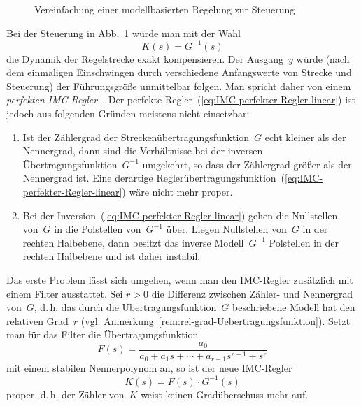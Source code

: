 \begin{figure}
\begin{centering}
\resizebox{0.65\textwidth}{!}{}
\par\end{centering}
\caption{Vereinfachung einer modellbasierten Regelung zur Steuerung\label{fig:Struktur-IMC-Steuerung}}
\end{figure}

Bei der Steuerung in Abb.~\ref{fig:Struktur-IMC-Steuerung} würde
man mit der Wahl 
\begin{equation}
K(s)=G^{-1}(s)\label{eq:IMC-perfekter-Regler-linear}
\end{equation}
die Dynamik der Regelstrecke exakt kompensieren. Der Ausgang~$y$
würde (nach dem einmaligen Einschwingen durch verschiedene Anfangswerte
von Strecke und Steuerung) der Führungsgröße unmittelbar folgen. Man
spricht daher von einem \emph{perfekten} \emph{IMC-Regler}~\cite{garcia1982}.
Der perfekte Regler~(\ref{eq:IMC-perfekter-Regler-linear}) ist jedoch
aus folgenden Gründen meistens nicht einsetzbar:
\begin{enumerate}
\item \label{enu:IMC-Problem1}Ist der Zählergrad der Streckenübertragungsfunktion~$G$
echt kleiner als der Nennergrad, dann sind die Verhältnisse bei der
inversen Übertragungsfunktion~$G^{-1}$ umgekehrt, so dass der Zählergrad
größer als der Nennergrad ist. Eine derartige Reglerübertragungsfunktion~(\ref{eq:IMC-perfekter-Regler-linear})
wäre nicht mehr proper. 
\item \label{enu:IMC-Problem2}Bei der Inversion~(\ref{eq:IMC-perfekter-Regler-linear})
gehen die Nullstellen von~$G$ in die Polstellen von~$G^{-1}$ über.
Liegen Nullstellen von~$G$ in der rechten Halbebene, dann besitzt
das inverse Modell~$G^{-1}$ Polstellen in der rechten Halbebene
und ist daher instabil.
\end{enumerate}

Das erste Problem lässt sich umgehen, wenn man den IMC-Regler zusätzlich
mit einem Filter ausstattet. Sei $r>0$ die Differenz zwischen Zähler-
und Nennergrad von~$G$, d.\,h. das durch die Übertragungsfunktion~$G$
beschriebene Modell hat den relativen Grad~$r$ (vgl. Anmerkung~\ref{rem:rel-grad-Uebertragungsfunktion}).
Setzt man für das Filter die Übertragungsfunktion
\begin{equation}
F(s)=\frac{a_{0}}{a_{0}+a_{1}s+\cdots+a_{r-1}s^{r-1}+s^{r}}\label{eq:IMC-Filter-F}
\end{equation}
mit einem stabilen Nennerpolynom an, so ist der neue IMC-Regler
\begin{equation}
K(s)=F(s)\cdot G^{-1}(s)\label{eq:IMC-Regler-mit-Filter-linear}
\end{equation}
proper, d.\,h. der Zähler von~$K$ weist keinen Gradüberschuss mehr
auf. 

